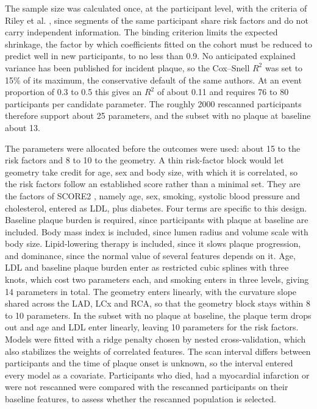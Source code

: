 The sample size was calculated once, at the participant level, with the criteria of Riley et al.
\cite{riley2020samplesize}, since segments of the same participant share risk factors and do not
carry independent information.
The binding criterion limits the expected shrinkage, the factor by which coefficients fitted on the
cohort must be reduced to predict well in new participants, to no less than 0.9.
No anticipated explained variance has been published for incident plaque, so the Cox--Snell $R^2$
was set to 15\% of its maximum, the conservative default of the same authors.
At an event proportion of 0.3 to 0.5 this gives an $R^2$ of about 0.11 and requires 76 to 80
participants per candidate parameter.
The roughly 2000 rescanned participants therefore support about 25 parameters, and the subset with
no plaque at baseline about 13.

The parameters were allocated before the outcomes were used: about 15 to the risk factors and 8 to
10 to the geometry.
A thin risk-factor block would let geometry take credit for age, sex and body size, with which it
is correlated, so the risk factors follow an established score rather than a minimal set.
They are the factors of SCORE2 \cite{score2_2021}, namely age, sex, smoking, systolic blood
pressure and cholesterol, entered as LDL, plus diabetes.
Four terms are specific to this design.
Baseline plaque burden is required, since participants with plaque at baseline are included.
Body mass index is included, since lumen radius and volume scale with body size.
Lipid-lowering therapy is included, since it slows plaque progression, and dominance, since the
normal value of several features depends on it.
Age, LDL and baseline plaque burden enter as restricted cubic splines with three knots, which cost
two parameters each, and smoking enters in three levels, giving 14 parameters in total.
The geometry enters linearly, with the curvature slope shared across the LAD, LCx and RCA, so that
the geometry block stays within 8 to 10 parameters.
In the subset with no plaque at baseline, the plaque term drops out and age and LDL enter linearly,
leaving 10 parameters for the risk factors.
Models were fitted with a ridge penalty \cite{hoerl1970ridge} chosen by nested cross-validation,
which also stabilizes the weights of correlated features.
The scan interval differs between participants and the time of plaque onset is unknown, so the
interval entered every model as a covariate.
Participants who died, had a myocardial infarction or were not rescanned were compared with the
rescanned participants on their baseline features, to assess whether the rescanned population is
selected.


